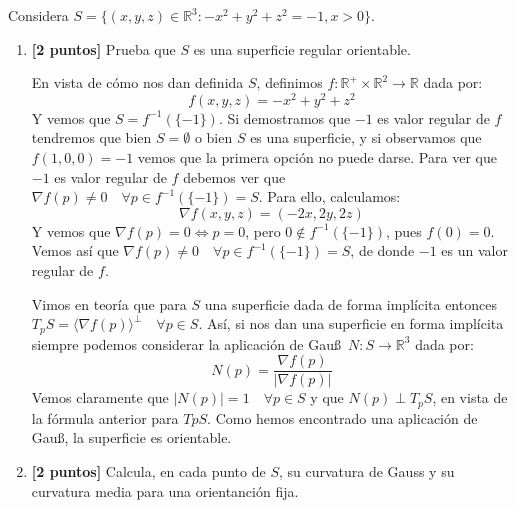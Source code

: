 \documentclass[12pt]{article}
\begin{document}
    \begin{ejercicio}
        Considera $S = \{(x,y,z)\in \mathbb{R}^3 : -x^2+y^2+z^2 = -1, x > 0\}$.
        \begin{enumerate}[label=\alph*)]
            \item \textbf{[2 puntos]} Prueba que $S$ es una superficie regular orientable.

                En vista de cómo nos dan definida $S$, definimos $f:\mathbb{R}^+\times\mathbb{R}^2\to\mathbb{R}$ dada por:
                \begin{equation*}
                    f(x,y,z) = -x^2+y^2+z^2 
                \end{equation*}
                Y vemos que $S = f^{-1}(\{-1\})$. Si demostramos que $-1$ es valor regular de $f$ tendremos que bien $S=\emptyset $ o bien $S$ es una superficie, y si observamos que $f(1,0,0) = -1$ vemos que la primera opción no puede darse. Para ver que $-1$ es valor regular de $f$  debemos ver que $\nabla f(p)\neq 0\quad \forall p\in f^{-1}(\{-1\}) = S$. Para ello, calculamos:
                \begin{equation*}
                    \nabla f(x,y,z) = (-2x,2y,2z)
                \end{equation*}
                Y vemos que $\nabla f(p) = 0 \Longleftrightarrow p = 0$, pero $0\notin f^{-1}(\{-1\})$, pues $f(0) = 0$. Vemos así que $\nabla f(p)\neq 0\quad \forall p\in f^{-1}(\{-1\}) = S$, de donde $-1$ es un valor regular de $f$.

                Vimos en teoría que para $S$ una superficie dada de forma implícita entonces $T_pS = \langle \nabla f(p) \rangle^\perp \quad \forall p\in S$. Así, si nos dan una superficie en forma implícita siempre podemos considerar la aplicación de Gau\ss\ $N:S\to\mathbb{R}^3$ dada por:
                \begin{equation*}
                    N(p) = \frac{\nabla f(p)}{|\nabla f(p)|}
                \end{equation*}
                Vemos claramente que $|N(p)| = 1\quad \forall p\in S$ y que $N(p)\perp T_pS$, en vista de la fórmula anterior para $TpS$. Como hemos encontrado una aplicación de Gau\ss, la superficie es orientable.
            \item \textbf{[2 puntos]} Calcula, en cada punto de $S$, su curvatura de Gauss y su curvatura media para una orientanción fija.


\end{enumerate}
\end{ejercicio}
\end{document}
